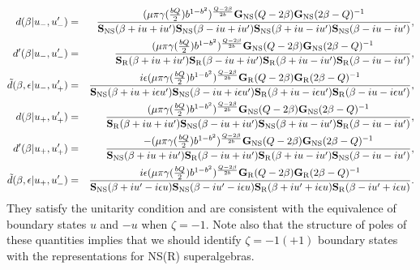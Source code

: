 \documentclass[a4paper,12pt]{article}
\newcommand{\tfrac}[2]{{\textstyle\frac{#1}{#2}}}
\newcommand{\NS}{{\rm NS}}
\newcommand{\R}{{\rm R}}
\newcommand{\bG}{{\bf G}}
\newcommand{\bS}{{\bf S}}
\newcommand{\ep}{{\epsilon}}
\begin{document}
\begin{eqnarray}
  d(\beta|u_-,u'_-)
 &=& \frac{(\mu\pi\gamma(\tfrac{bQ}{2})b^{1-b^2})^{\frac{Q-2\beta}{2b}}
           \bG_\NS(Q-2\beta)\bG_\NS(2\beta-Q)^{-1}}
          {\bS_\NS(\beta+iu+iu')
           \bS_\NS(\beta-iu+iu')
           \bS_\NS(\beta+iu-iu')
           \bS_\NS(\beta-iu-iu')},
 \nonumber \\
  d'(\beta|u_-,u'_-)
 &=& \frac{(\mu\pi\gamma(\tfrac{bQ}{2})b^{1-b^2})^{\frac{Q-2\beta}{2b}}
           \bG_\NS(Q-2\beta)\bG_\NS(2\beta-Q)^{-1}}
          {\bS_\R(\beta+iu+iu')
           \bS_\R(\beta-iu+iu')
           \bS_\R(\beta+iu-iu')
           \bS_\R(\beta-iu-iu')},
 \nonumber \\
  \tilde{d}(\beta,\ep|u_-,u'_+)
 &=& \frac{i\ep(\mu\pi\gamma(\tfrac{bQ}{2})b^{1-b^2})^{\frac{Q-2\beta}{2b}}
           \bG_\R(Q-2\beta)\bG_\R(2\beta-Q)^{-1}}
          {\bS_\NS(\beta+iu+i\ep u')
           \bS_\NS(\beta-iu+i\ep u')
           \bS_\R (\beta+iu-i\ep u')
           \bS_\R (\beta-iu-i\ep u')},
 \nonumber \\
  d(\beta|u_+,u'_+)
 &=& \frac{(\mu\pi\gamma(\tfrac{bQ}{2})b^{1-b^2})^{\frac{Q-2\beta}{2b}}
           \bG_\NS(Q-2\beta)\bG_\NS(2\beta-Q)^{-1}}
          {\bS_\R(\beta+iu+iu')
           \bS_\NS(\beta-iu+iu')
           \bS_\NS(\beta+iu-iu')
           \bS_\R(\beta-iu-iu')},
 \nonumber \\
  d'(\beta|u_+,u'_+)
 &=& \frac{-(\mu\pi\gamma(\tfrac{bQ}{2})b^{1-b^2})^{\frac{Q-2\beta}{2b}}
           \bG_\NS(Q-2\beta)\bG_\NS(2\beta-Q)^{-1}}
          {\bS_\NS(\beta+iu+iu')
           \bS_\R(\beta-iu+iu')
           \bS_\R(\beta+iu-iu')
           \bS_\NS(\beta-iu-iu')},
 \nonumber \\
  \tilde{d}(\beta,\ep|u_+,u'_-)
 &=& \frac{i\ep(\mu\pi\gamma(\tfrac{bQ}{2})b^{1-b^2})^{\frac{Q-2\beta}{2b}}
           \bG_\R(Q-2\beta)\bG_\R(2\beta-Q)^{-1}}
          {\bS_\NS(\beta+iu'-i\ep u)
           \bS_\NS(\beta-iu'-i\ep u)
           \bS_\R (\beta+iu'+i\ep u)
           \bS_\R (\beta-iu'+i\ep u)}.
 \nonumber \\
\end{eqnarray}
 They satisfy the unitarity condition and are consistent with
 the equivalence of boundary states $u$ and $-u$ when $\zeta=-1$.
 Note also that the structure of poles of these quantities implies
 that we should identify $\zeta=-1(+1)$ boundary states with
 the representations for NS(R) superalgebras.
\end{document}
